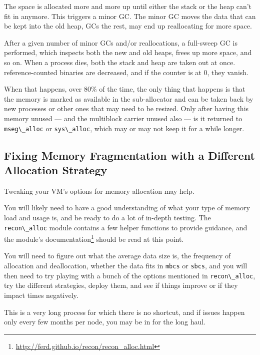 \documentclass[11pt, oneside]{book}   	%
\newcommand{\module}[1]{\Verb`#1`}
\newcommand{\term}[1]{\Verb`#1`}
\begin{document}
\begin{VerbatimText}
\end{VerbatimText}

The space is allocated more and more up until either the stack or the heap can't fit in anymore. This triggers a minor GC. The minor GC moves the data that can be kept into the old heap, GCs the rest, may end up reallocating for more space.

After a given number of minor GCs and/or reallocations, a full-sweep GC is performed, which inspects both the new and old heaps, frees up more space, and so on. When a process dies, both the stack and heap are taken out at once. reference-counted binaries are decreased, and if the counter is at 0, they vanish.

When that happens, over 80\% of the time, the only thing that happens is that the memory is marked as available in the sub-allocator and can be taken back by new processes or other ones that may need to be resized. Only after having this memory unused — and the multiblock carrier unused also — is it returned to \term{mseg\_alloc} or \term{sys\_alloc}, which may or may not keep it for a while longer.

\subsection{Fixing Memory Fragmentation with a Different Allocation Strategy}

Tweaking your VM's options for memory allocation may help.

You will likely need to have a good understanding of what your type of memory load and usage is, and be ready to do a lot of in-depth testing. The \module{recon\_alloc} module contains a few helper functions to provide guidance, and the module's documentation\footnote{\href{http://ferd.github.io/recon/recon\_alloc.html}{http://ferd.github.io/recon/recon\_alloc.html}} should be read at this point.

You will need to figure out what the average data size is, the frequency of allocation and deallocation, whether the data fits in \term{mbcs} or \term{sbcs},  and you will then need to try playing with a bunch of the options mentioned in \module{recon\_alloc}, try the different strategies, deploy them, and see if things improve or if they impact times negatively.

This is a very long process for which there is no shortcut, and if issues happen only every few months per node, you may be in for the long haul. 
\end{document}
